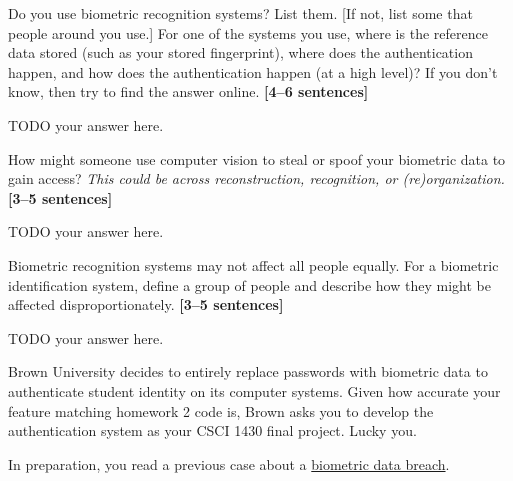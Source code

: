 \documentclass{csci1430}
\begin{document}
\begin{subquestion}[points=3]
Do you use biometric recognition systems? List them. [If not, list some that people around you use.]
For one of the systems you use, where is the reference data stored (such as your stored fingerprint), where does the authentication happen, and how does the authentication happen (at a high level)? 
If you don't know, then try to find the answer online. \textbf{[4--6 sentences]}
\end{subquestion}
    
\begin{answer}[height=14]
TODO your answer here.
\end{answer}

\pagebreak

\begin{subquestion}[points=3]
How might someone use computer vision to steal or spoof your biometric data to gain access? \emph{This could be across reconstruction, recognition, or (re)organization.} \textbf{[3--5 sentences]}
\end{subquestion}

\begin{answer}[height=14]
TODO your answer here.
\end{answer}
    

\begin{subquestion}[points=3]
Biometric recognition systems may not affect all people equally. For a biometric identification system, define a group of people and describe how they might be affected disproportionately. \textbf{[3--5 sentences]}
\end{subquestion}
    
\begin{answer}[height=14]
TODO your answer here.
\end{answer}
    

\pagebreak

\begin{question}[points=7,drawbox=false] 
Brown University decides to entirely replace passwords with biometric data to authenticate student identity on its computer systems. Given how accurate your feature matching homework 2 code is, Brown asks you to develop the authentication system as your CSCI 1430 final project. Lucky you.

In preparation, you read a previous case about a \href{https://www.vpnmentor.com/blog/report-biostar2-leak/}{biometric data breach}.
\end{question}
\end{document}
